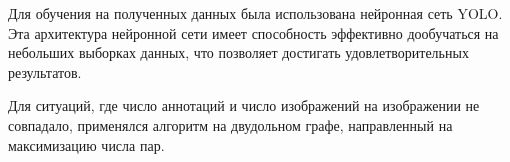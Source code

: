 
Для обучения на полученных данных была использована нейронная сеть YOLO. Эта архитектура нейронной сети имеет способность эффективно дообучаться на небольших выборках данных, что позволяет достигать удовлетворительных результатов.

Для ситуаций, где число аннотаций и число изображений на изображении не совпадало, применялся алгоритм на двудольном графе, направленный на максимизацию числа пар.
